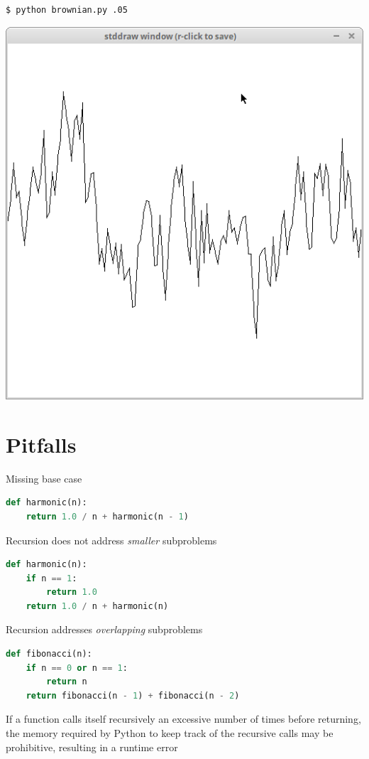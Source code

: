\documentclass[8pt,a4paper,compress]{beamer}
\begin{document}
\begin{frame}[fragile]
\begin{minipage}{160pt}
\begin{lstlisting}[language={}]
$ python brownian.py .05
\end{lstlisting}
\end{minipage}%
\begin{minipage}{140pt}
\hfill \includegraphics[scale=0.15]{figures/brownian3.png}
\end{minipage}
\end{frame}

\section{Pitfalls}
\begin{frame}[fragile]
Missing base case
\begin{lstlisting}[language=Python]
def harmonic(n):
    return 1.0 / n + harmonic(n - 1)
\end{lstlisting}

\bigskip

Recursion does not address \emph{smaller} subproblems
\begin{lstlisting}[language=Python]
def harmonic(n):
    if n == 1: 
        return 1.0
    return 1.0 / n + harmonic(n)
\end{lstlisting}

\bigskip

Recursion addresses \emph{overlapping} subproblems
\begin{lstlisting}[language=Python]
def fibonacci(n):
    if n == 0 or n == 1:
        return n
    return fibonacci(n - 1) + fibonacci(n - 2)  
\end{lstlisting}

\bigskip

If a function calls itself recursively an excessive number of times before returning, the memory required by Python to keep track of the recursive calls may be prohibitive, resulting in a runtime error
\end{frame}
\end{document}
